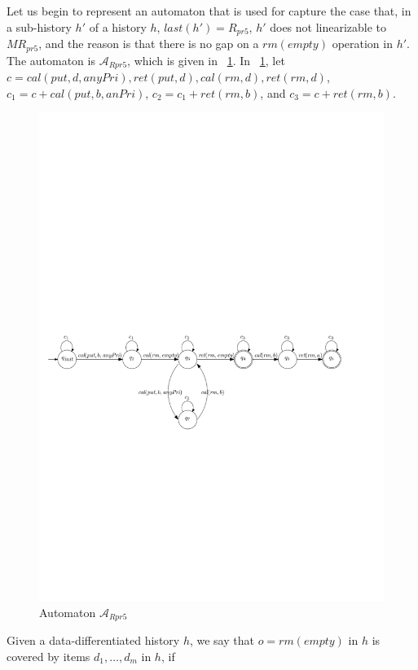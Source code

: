 Let us begin to represent an automaton that is used for capture the case that, in a sub-history $h'$ of a history $h$, $\textit{last}(h')=R_{\textit{pr5}}$, $h'$ does not linearizable to $\textit{MR}_{\textit{pr5}}$, and the reason is that there is no gap on a $\textit{rm}(\textit{empty})$ operation in $h'$. The automaton is $\mathcal{A}_{\textit{Rpr5}}$, which is given in \figurename~\ref{fig:automata for Rpr5}. In \figurename~\ref{fig:automata for Rpr5}, let $c = \textit{cal}(\textit{put},d,\textit{anyPri}),\textit{ret}(\textit{put},d), \textit{cal}(\textit{rm},d), \textit{ret}(\textit{rm},d)$, $c_1 = c + \textit{cal}(\textit{put},b,\textit{anPri})$, $c_2 = c_1 + \textit{ret}(\textit{rm},b)$, and $c_3 = c + \textit{ret}(\textit{rm},b)$.

\begin{figure}[htbp]
  \centering
  \includegraphics[width=0.8 \textwidth]{PIC_AUTO_Rpr5.pdf}
  \caption{Automaton $\mathcal{A}_{\textit{Rpr5}}$}
  \label{fig:automata for Rpr5}
\end{figure}

Given a data-differentiated history $h$, we say that $o = \textit{rm}(\textit{empty})$ in $h$ is covered by items $d_1,\ldots,d_m$ in $h$, if


